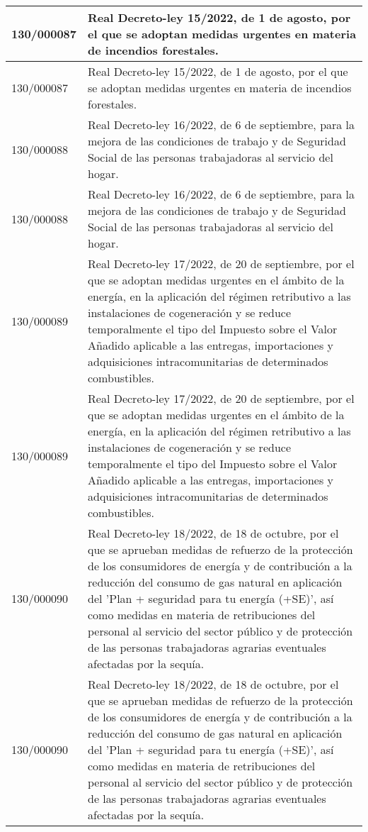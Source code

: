 {\begin{table}[H]
\begin{center}
\begin{tabularx}{\linewidth}{| l | X |}
\hline
130/000087 & Real Decreto-ley 15/2022, de 1 de agosto, por el que se adoptan medidas urgentes en materia de incendios forestales. \\
\hline
130/000087 & Real Decreto-ley 15/2022, de 1 de agosto, por el que se adoptan medidas urgentes en materia de incendios forestales. \\
\hline
130/000088 & Real Decreto-ley 16/2022, de 6 de septiembre, para la mejora de las condiciones de trabajo y de Seguridad Social de las personas trabajadoras al servicio del hogar. \\
\hline
130/000088 & Real Decreto-ley 16/2022, de 6 de septiembre, para la mejora de las condiciones de trabajo y de Seguridad Social de las personas trabajadoras al servicio del hogar. \\
\hline
130/000089 & Real Decreto-ley 17/2022, de 20 de septiembre, por el que se adoptan medidas urgentes en el ámbito de la energía, en la aplicación del régimen retributivo a las instalaciones de cogeneración y se reduce temporalmente el tipo del Impuesto sobre el Valor Añadido aplicable a las entregas, importaciones y adquisiciones intracomunitarias de determinados combustibles. \\
\hline
130/000089 & Real Decreto-ley 17/2022, de 20 de septiembre, por el que se adoptan medidas urgentes en el ámbito de la energía, en la aplicación del régimen retributivo a las instalaciones de cogeneración y se reduce temporalmente el tipo del Impuesto sobre el Valor Añadido aplicable a las entregas, importaciones y adquisiciones intracomunitarias de determinados combustibles. \\
\hline
130/000090 & Real Decreto-ley 18/2022, de 18 de octubre, por el que se aprueban medidas de refuerzo de la protección de los consumidores de energía y de contribución a la reducción del consumo de gas natural en aplicación del 'Plan + seguridad para tu energía (+SE)', así como medidas en materia de retribuciones del personal al servicio del sector público y de protección de las personas trabajadoras agrarias eventuales afectadas por la sequía. \\
\hline
130/000090 & Real Decreto-ley 18/2022, de 18 de octubre, por el que se aprueban medidas de refuerzo de la protección de los consumidores de energía y de contribución a la reducción del consumo de gas natural en aplicación del 'Plan + seguridad para tu energía (+SE)', así como medidas en materia de retribuciones del personal al servicio del sector público y de protección de las personas trabajadoras agrarias eventuales afectadas por la sequía. \\

\end{tabularx}
\end{center}
\end{table}}
